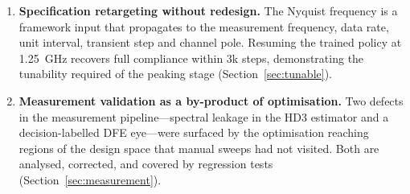 \documentclass[10pt,a4paper]{article}
\begin{document}
\begin{enumerate}[leftmargin=*,itemsep=2pt,topsep=3pt]
\item \textbf{Specification retargeting without redesign.} The Nyquist frequency
is a framework input that propagates to the measurement frequency, data rate,
unit interval, transient step and channel pole. Resuming the trained policy at
\SI{1.25}{\giga\hertz} recovers full compliance within 3k steps, demonstrating
the tunability required of the peaking stage (Section~\ref{sec:tunable}).

\item \textbf{Measurement validation as a by-product of optimisation.} Two
defects in the measurement pipeline---spectral leakage in the HD3 estimator and a
decision-labelled DFE eye---were surfaced by the optimisation reaching regions of
the design space that manual sweeps had not visited. Both are analysed,
corrected, and covered by regression tests (Section~\ref{sec:measurement}).
\end{enumerate}



\end{document}
